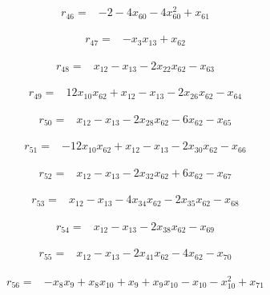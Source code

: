 \begin{align*}
r_{46}={}&-2-4x_{60}-4x_{60}^{2}+x_{61}
\end{align*}

\begin{align*}
r_{47}={}&-x_{3}x_{13}+x_{62}
\end{align*}

\begin{align*}
r_{48}={}&x_{12}-x_{13}-2x_{22}x_{62}-x_{63}
\end{align*}

\begin{align*}
r_{49}={}&12x_{10}x_{62}+x_{12}-x_{13}-2x_{26}x_{62}-x_{64}
\end{align*}

\begin{align*}
r_{50}={}&x_{12}-x_{13}-2x_{28}x_{62}-6x_{62}-x_{65}
\end{align*}

\begin{align*}
r_{51}={}&-12x_{10}x_{62}+x_{12}-x_{13}-2x_{30}x_{62}-x_{66}
\end{align*}

\begin{align*}
r_{52}={}&x_{12}-x_{13}-2x_{32}x_{62}+6x_{62}-x_{67}
\end{align*}

\begin{align*}
r_{53}={}&x_{12}-x_{13}-4x_{34}x_{62}-2x_{35}x_{62}-x_{68}
\end{align*}

\begin{align*}
r_{54}={}&x_{12}-x_{13}-2x_{38}x_{62}-x_{69}
\end{align*}

\begin{align*}
r_{55}={}&x_{12}-x_{13}-2x_{41}x_{62}-4x_{62}-x_{70}
\end{align*}

\begin{align*}
r_{56}={}&-x_{8}x_{9}+x_{8}x_{10}+x_{9}+x_{9}x_{10}-x_{10}-x_{10}^{2}+x_{71}
\end{align*}


